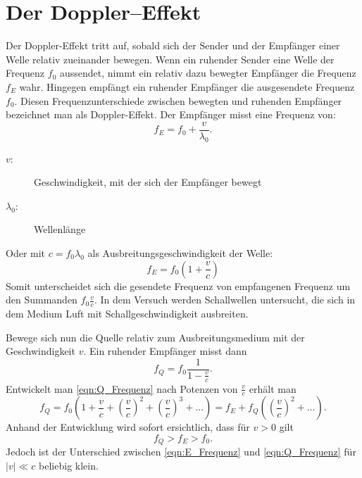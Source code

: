 \documentclass[parskip=half]{scrartcl}
\begin{document}
\section{Der Doppler--Effekt}
Der Doppler-Effekt tritt auf, sobald sich der Sender und der Empfänger einer Welle relativ zueinander bewegen.
Wenn ein ruhender Sender eine Welle der Frequenz $f_0$ aussendet, nimmt ein relativ dazu bewegter Empfänger die Frequenz $f_E$ wahr. Hingegen empfängt ein ruhender Empfänger die ausgesendete Frequenz $f_0$. Diesen Frequenzunterschiede zwischen bewegten und ruhenden Empfänger bezeichnet man als Doppler-Effekt.
Der Empfänger misst eine Frequenz von:
 \begin{equation*}
   f_E = f_0 + \frac{v}{\lambda_0}.
 \end{equation*}
\begin{description}
    \item[$v$:] Geschwindigkeit, mit der sich der Empfänger bewegt
    \item[$\lambda_0$:] Wellenlänge
\end{description}

Oder mit $c = f_0\lambda_0$ als Ausbreitungsgeschwindigkeit der Welle:
\begin{equation}
  f_E = f_0(1 + \frac{v}{c})
  \label{eqn:E_Frequenz}
\end{equation}
Somit unterscheidet sich die gesendete Frequenz von empfangenen Frequenz um den Summanden $f_0\frac{v}{c}$.
In dem Versuch werden Schallwellen untersucht, die sich in dem Medium Luft mit Schallgeschwindigkeit ausbreiten.

Bewege sich nun die Quelle relativ zum Ausbreitungsmedium mit der Geschwindigkeit $v$. Ein ruhender Empfänger misst dann
\begin{equation}
  f_Q = f_0\frac{1}{1 - \frac{v}{c}} .
  \label{eqn:Q_Frequenz}
\end{equation}
Entwickelt man \eqref{eqn:Q_Frequenz} nach Potenzen von $\frac{v}{c}$ erhält man
\begin{equation*}
  f_Q = f_0(1 + \frac{v}{c} + (\frac{v}{c})^2 + (\frac{v}{c})^3 + ...) = f_E + f_Q((\frac{v}{c})^2 + ...) .
\end{equation*}
Anhand der Entwicklung wird sofort ersichtlich, dass für $v > 0$ gilt
\begin{equation*}
  f_Q > f_E > f_0 .
\end{equation*}
Jedoch ist der Unterschied zwischen \eqref{eqn:E_Frequenz} und \eqref{eqn:Q_Frequenz} für $\lvert v \rvert \ll c$ beliebig klein.
\end{document}

